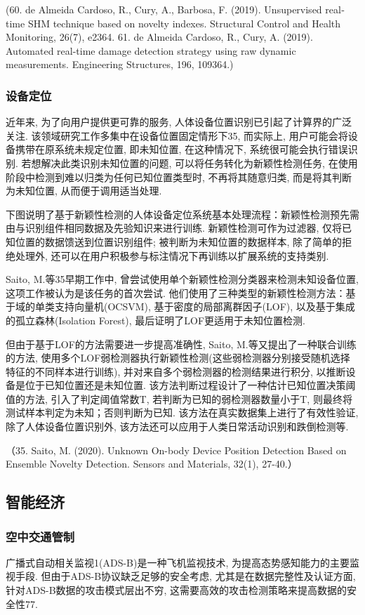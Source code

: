 \documentclass{Style/aas}
\begin{document}
\begin{multicols}{2}
  (60.	de Almeida Cardoso, R., Cury, A., Barbosa, F. (2019). Unsupervised real‐time SHM technique based on novelty indexes. Structural Control and Health Monitoring, 26(7), e2364.
  61.	de Almeida Cardoso, R., Cury, A. (2019). Automated real-time damage detection strategy using raw dynamic measurements. Engineering Structures, 196, 109364.)

  \subsubsection{设备定位}
  近年来, 为了向用户提供更可靠的服务, 人体设备位置识别已引起了计算界的广泛关注. 该领域研究工作多集中在设备位置固定情形下35, 而实际上, 用户可能会将设备携带在原系统未规定位置, 即未知位置, 在这种情况下, 系统很可能会执行错误识别. 若想解决此类识别未知位置的问题, 可以将任务转化为新颖性检测任务, 在使用阶段中检测到难以归类为任何已知位置类型时, 不再将其随意归类, 而是将其判断为未知位置, 从而便于调用适当处理.

  下图说明了基于新颖性检测的人体设备定位系统基本处理流程：新颖性检测预先需由与识别组件相同数据及先验知识来进行训练. 新颖性检测可作为过滤器, 仅将已知位置的数据馈送到位置识别组件; 被判断为未知位置的数据样本, 除了简单的拒绝处理外, 还可以在用户积极参与标注情况下再训练以扩展系统的支持类别.

  Saito, M.等35早期工作中, 曾尝试使用单个新颖性检测分类器来检测未知设备位置, 这项工作被认为是该任务的首次尝试. 他们使用了三种类型的新颖性检测方法：基于域的单类支持向量机(OCSVM), 基于密度的局部离群因子(LOF), 以及基于集成的孤立森林(Isolation Forest), 最后证明了LOF更适用于未知位置检测.

  但由于基于LOF的方法需要进一步提高准确性, Saito, M.等又提出了一种联合训练的方法, 使用多个LOF弱检测器执行新颖性检测(这些弱检测器分别接受随机选择特征的不同样本进行训练), 并对来自多个弱检测器的检测结果进行积分, 以推断设备是位于已知位置还是未知位置. 该方法判断过程设计了一种估计已知位置决策阈值的方法, 引入了判定阈值常数T, 若判断为已知的弱检测器数量小于T, 则最终将测试样本判定为未知；否则判断为已知. 该方法在真实数据集上进行了有效性验证, 除了人体设备位置识别外, 该方法还可以应用于人类日常活动识别和跌倒检测等.

  （35.	Saito, M. (2020). Unknown On-body Device Position Detection Based on Ensemble Novelty Detection. Sensors and Materials, 32(1), 27-40.）

  \subsection{智能经济}
  \subsubsection{空中交通管制}
  广播式自动相关监视1(ADS-B)是一种飞机监视技术, 为提高态势感知能力的主要监视手段. 但由于ADS-B协议缺乏足够的安全考虑, 尤其是在数据完整性及认证方面,  针对ADS-B数据的攻击模式层出不穷, 这需要高效的攻击检测策略来提高数据的安全性77.


\end{multicols}
\end{document}
